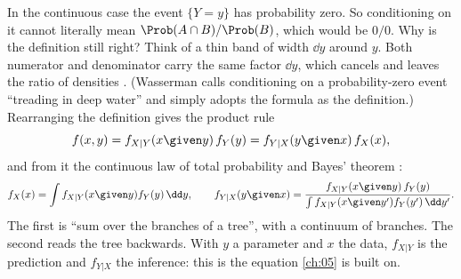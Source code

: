In the continuous case the event $\{Y=y\}$ has probability zero. So
conditioning on it cannot literally mean $\Prob(A\cap B)/\Prob(B)$, which
would be $0/0$. Why is the definition still right? Think of a thin band of
width $\dd y$ around $y$. Both numerator and denominator carry the same
factor $\dd y$, which cancels and leaves the ratio of densities
. (Wasserman  calls
conditioning on a probability-zero event ``treading in deep water'' and
simply adopts the formula as the definition.) Rearranging the definition
gives the product rule
\begin{equation}
  f(x,y)=f_{X|Y}(x\given y)\,f_Y(y)=f_{Y|X}(y\given x)\,f_X(x),
  \label{1b:eq:product-rule}
\end{equation}
and from it the continuous law of total probability and Bayes' theorem
:
\begin{equation}
  f_X(x)=\int f_{X|Y}(x\given y)f_Y(y)\,\dd y,
  \qquad
  f_{Y|X}(y\given x)=\frac{f_{X|Y}(x\given y)\,f_Y(y)}{\int f_{X|Y}(x\given y')f_Y(y')\,\dd y'} .
  \label{1b:eq:cont-bayes}
\end{equation}
The first is ``sum over the branches of a tree'', with a continuum of
branches. The second reads the tree backwards. With $y$ a parameter and $x$
the data, $f_{X|Y}$ is the prediction and $f_{Y|X}$ the inference: this is
the equation \cref{ch:05} is built on.

